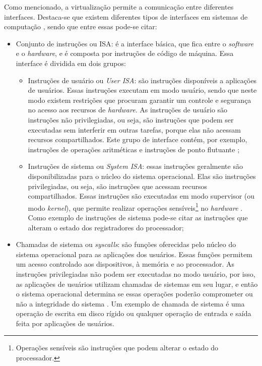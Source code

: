 Como mencionado, a virtualização permite a comunicação entre diferentes interfaces. Destaca-se que existem diferentes tipos de interfaces
em sistemas de computação \cite{maziero2013}, sendo que entre essas pode-se citar:
\begin{itemize}
 \item Conjunto de instruções ou \ac{ISA}: é a interface básica, que fica entre o \textit{software} e o \textit{hardware}, e é composta por 
 instruções de código de máquina. Essa interface é dividida em dois grupos:
 \begin{itemize}
  \item Instruções de usuário ou \textit{User \ac{ISA}}: são instruções disponíveis a aplicações de usuários. Essas instruções executam em 
  modo usuário, sendo que neste modo existem restrições que procuram garantir um controle e segurança no acesso aos recursos de \textit{hardware}. 
  As instruções de usuário são instruções não privilegiadas, ou seja, são instruções que podem ser executadas sem interferir em outras tarefas, 
  porque elas não acessam recursos compartilhados. Este grupo de interface contém, por exemplo, instruções de operações aritméticas e instruções 
  de ponto flutuante \cite{buyya2013};
  \item Instruções de sistema ou \textit{System \ac{ISA}}: essas instruções geralmente são disponibilizadas para o núcleo do sistema operacional. 
  Elas são instruções privilegiadas, ou seja, são instruções que acessam recursos compartilhados. Essas instruções são executadas em modo 
  supervisor (ou modo \textit{kernel}), que permite realizar operações sensíveis\footnote[1]{Operações sensíveis são instruções que podem alterar o 
  estado do processador.} no \textit{hardware} \cite{buyya2013}. Como exemplo de instruções de sistema pode-se citar as instruções que alteram 
  o estado dos registradores do processador; %
 \end{itemize}
 \item Chamadas de sistema ou \textit{syscalls}: são funções oferecidas pelo núcleo do sistema operacional para as aplicações dos usuários.
 Essas funções permitem um acesso controlado aos dispositivos, à memória e ao processador. 
 As instruções privilegiadas não podem ser executadas no modo usuário, por isso, as aplicações de usuários utilizam chamadas de sistemas em seu 
 lugar, e então o sistema operacional determina se essas operações poderão comprometer ou não a integridade do sistema \cite{marinescu2013}.
 Um exemplo de chamada de sistema é uma operação de escrita em disco rígido ou qualquer operação de entrada e saída feita por aplicações de usuários.
\end{itemize}

